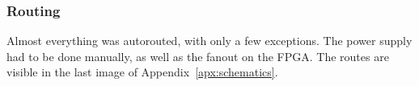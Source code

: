 
\subsubsection{Routing}

Almost everything was autorouted, with only a few exceptions. The power supply had to be done manually, as well as the fanout on the FPGA. The routes are visible in the last image of Appendix~\ref{apx:schematics}.